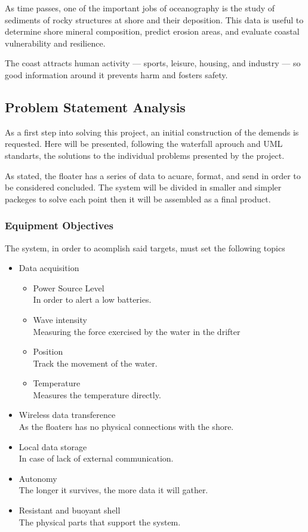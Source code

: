 As time passes, one of the important jobs of oceanography is the study of sediments of rocky
structures at shore and their deposition. This data is useful to determine shore mineral composition,
predict erosion areas, and evaluate coastal vulnerability and resilience.

The coast attracts human activity — sports, leisure, housing, and industry — so good information around it prevents harm and fosters safety.   

\subsection{Problem Statement Analysis}
As a first step into solving this project, an initial construction of the
demends is requested. Here will be presented, following the waterfall aprouch
and UML standarts, the solutions to the individual problems presented by the project.

As stated, the floater has a series of data to acuare, format, and send in order to 
be considered concluded. The system will be divided in smaller and simpler packeges to solve
each point then it will be assembled as a final product.

\subsubsection{Equipment Objectives}
The system, in order to acomplish said targets, must set the following topics

\begin{itemize}
    \item Data acquisition
    \begin{itemize}
        \item Power Source Level \\ In order to alert a low batteries.
        \item Wave intensity \\ Measuring the force exercised by the water in the drifter
        \item Position \\ Track the movement of the water.
        \item Temperature \\ Measures the temperature directly.
    \end{itemize}
    \item Wireless data transference \\ As the floaters has no physical connections with the shore. 
    \item Local data storage \\ In case of lack of external communication.
    \item Autonomy \\ The longer it survives, the more data it will gather.
    \item Resistant and buoyant shell \\ The physical parts that support the system.
\end{itemize}




